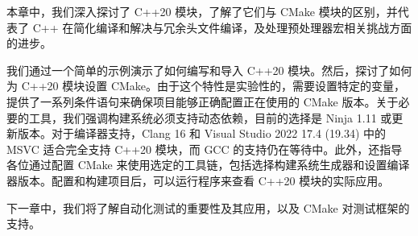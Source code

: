 本章中，我们深入探讨了 C++20 模块，了解了它们与 CMake 模块的区别，并代表了 C++ 在简化编译和解决与冗余头文件编译，及处理预处理器宏相关挑战方面的进步。

我们通过一个简单的示例演示了如何编写和导入 C++20 模块。然后，探讨了如何为 C++20 模块设置 CMake。由于这个特性是实验性的，需要设置特定的变量，提供了一系列条件语句来确保项目能够正确配置正在使用的 CMake 版本。关于必要的工具，我们强调构建系统必须支持动态依赖，目前的选择是 Ninja 1.11 或更新版本。对于编译器支持，Clang 16 和 Visual Studio 2022 17.4 (19.34) 中的 MSVC 适合完全支持 C++20 模块，而 GCC 的支持仍在等待中。此外，还指导各位通过配置 CMake 来使用选定的工具链，包括选择构建系统生成器和设置编译器版本。配置和构建项目后，可以运行程序来查看 C++20 模块的实际应用。

下一章中，我们将了解自动化测试的重要性及其应用，以及 CMake 对测试框架的支持。